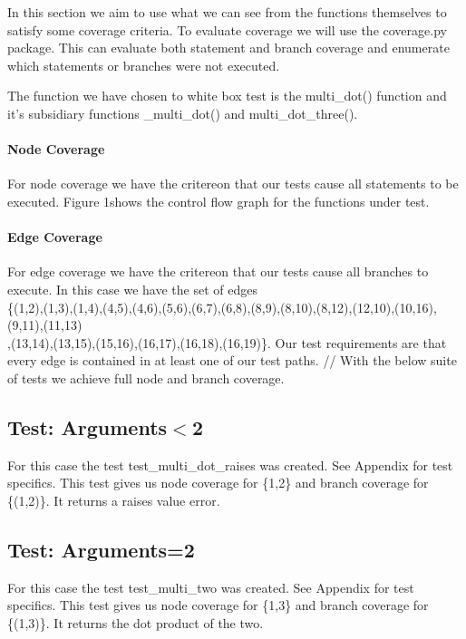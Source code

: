 In this section we aim to use what we can see from the functions themselves to satisfy some coverage
criteria. To evaluate coverage we will use the coverage.py package. This can evaluate both statement and branch coverage and enumerate which statements or branches were not executed.

The function we have chosen to white box test is the multi\_dot() function and it's subsidiary functions \_multi\_dot() and multi\_dot\_three().

\paragraph{Node Coverage}


For node coverage we have the critereon that our tests cause all statements to be executed. Figure 1shows the control flow graph for the functions under test. 



\paragraph{Edge Coverage}

For edge coverage we have the critereon that our tests cause all branches to execute. In this case we have the set of edges \\
\{(1,2),(1,3),(1,4),(4,5),(4,6),(5,6),(6,7),(6,8),(8,9),(8,10),(8,12),(12,10),(10,16),(9,11),(11,13)\\
,(13,14),(13,15),(15,16),(16,17),(16,18),(16,19)\}.
Our test requirements are that every edge is contained in at least one of our test paths.
//
With the below suite of tests we achieve full node and branch coverage.
\subsection{Test: Arguments$<$2}
For this case the test test\_multi\_dot\_raises was created. See Appendix for test specifics.
This test gives us node coverage for \{1,2\} and branch coverage for \{(1,2)\}. It returns a raises value error.

\subsection{Test: Arguments=2}

For this case the test test\_multi\_two was created. See Appendix for test specifics.
This test gives us node coverage for \{1,3\} and branch coverage for \{(1,3)\}. It returns the dot product of the two.


